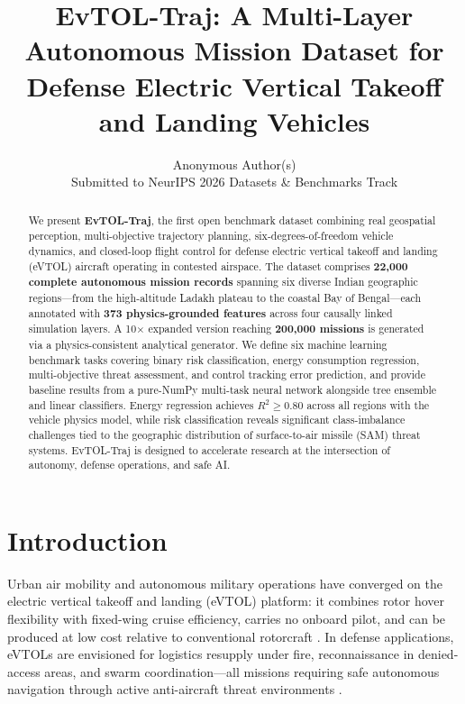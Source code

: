 \documentclass{article}
\title{EvTOL-Traj: A Multi-Layer Autonomous Mission Dataset for\\
Defense Electric Vertical Takeoff and Landing Vehicles}
\author{%
  Anonymous Author(s)\\
  Submitted to NeurIPS 2026 Datasets \& Benchmarks Track
}
\begin{document}
\maketitle

\begin{abstract}
We present \textbf{EvTOL-Traj}, the first open benchmark dataset combining
real geospatial perception, multi-objective trajectory planning, six-degrees-of-freedom
vehicle dynamics, and closed-loop flight control for defense electric vertical
takeoff and landing (eVTOL) aircraft operating in contested airspace.
The dataset comprises \textbf{22{,}000 complete autonomous mission records}
spanning six diverse Indian geographic regions---from the high-altitude Ladakh
plateau to the coastal Bay of Bengal---each annotated with \textbf{373 physics-grounded
features} across four causally linked simulation layers.
A 10$\times$ expanded version reaching \textbf{200{,}000 missions} is
generated via a physics-consistent analytical generator.
We define six machine learning benchmark tasks covering binary risk classification,
energy consumption regression, multi-objective threat assessment, and control
tracking error prediction, and provide baseline results from a pure-NumPy
multi-task neural network alongside tree ensemble and linear classifiers.
Energy regression achieves $R^2 \geq 0.80$ across all regions with the
vehicle physics model, while risk classification reveals significant class-imbalance
challenges tied to the geographic distribution of surface-to-air missile
(SAM) threat systems. EvTOL-Traj is designed to accelerate research at the
intersection of autonomy, defense operations, and safe AI.
\end{abstract}

\section{Introduction}
\label{sec:intro}

Urban air mobility and autonomous military operations have converged on the
electric vertical takeoff and landing (eVTOL) platform: it combines rotor
hover flexibility with fixed-wing cruise efficiency, carries no onboard pilot,
and can be produced at low cost relative to conventional rotorcraft
\citep{garrow2021urban,johnson2020nasa}.
In defense applications, eVTOLs are envisioned for logistics resupply under
fire, reconnaissance in denied-access areas, and swarm coordination---all
missions requiring safe autonomous navigation through active anti-aircraft
threat environments \citep{dod2022autonomy}.
\end{document}
